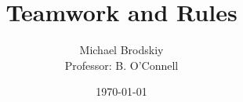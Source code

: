 


\title{Teamwork and Rules}
\date{\today}
\author{Michael Brodskiy\\ \small Professor: B. O'Connell}



\maketitle


